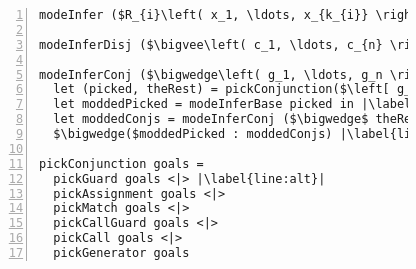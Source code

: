 


\begin{figure}[h]
  \centering
  \begin{minipage}{\columnwidth}
    \begin{lstlisting}[label={fig:modeInference},
                       caption={Mode inference pseudocode},
                       captionpos=b,
                       frame=tb, 
                       escapechar=|, 
                       numbers=left, 
                       numberstyle={\footnotesize}]
modeInfer ($R_{i}\left( x_1, \ldots, x_{k_{i}} \right) \equiv body$) = ($R_{i}\left( x_1, \ldots, x_{k_{i}} \right) \equiv$ (modeInferDisj body)) |\label{line:body}| 

modeInferDisj ($\bigvee\left( c_1, \ldots, c_{n} \right)$) = $\bigvee( $modeInferConj $ c_1, \ldots, $ modeInferConj $ c_{n})$ |\label{line:disj}| 

modeInferConj ($\bigwedge\left( g_1, \ldots, g_n \right)$) =
  let (picked, theRest) = pickConjunction($\left[ g_1, \ldots, g_n \right]$) in |\label{line:pick}| 
  let moddedPicked = modeInferBase picked in |\label{line:pick_analyze}| 
  let moddedConjs = modeInferConj ($\bigwedge$ theRest) in |\label{line:conj}| 
  $\bigwedge($moddedPicked : moddedConjs) |\label{line:result}|

pickConjunction goals =
  pickGuard goals <|> |\label{line:alt}|
  pickAssignment goals <|>
  pickMatch goals <|>
  pickCallGuard goals <|>
  pickCall goals <|>
  pickGenerator goals
    \end{lstlisting}
  \end{minipage}
\end{figure}